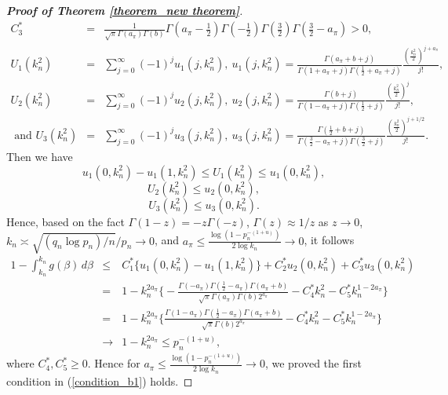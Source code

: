 \documentclass[12pt]{article}
\begin{document}
\begin{proof} [\textbf{Proof of Theorem \ref{theorem_new theorem}}]
\begin{eqnarray*}
		C_3^\ast   &=& \frac{1}{\sqrt{\pi}\Gamma(a_{\pi})\Gamma(b)}    \Gamma(a_{\pi}-\frac{1}{2})\Gamma(-\frac{1}{2})\Gamma(\frac{3}{2})\Gamma(\frac{3}{2}-a_{\pi}) > 0 , \\
		U_1(k_n^2) &=&
		\sum\limits_{j=0}^{\infty}(-1)^j  u_1(j, k_n^2),  \
		u_1(j, k_n^2) =  \frac{\Gamma(a_{\pi}+b+j) }{\Gamma(1+a_{\pi}+j)\Gamma(\frac{1}{2} + a_{\pi}+j) } \frac{ (\frac{k_n^2}{2})^{j+a_{\pi}}} {j!} , \\
		U_2(k_n^2) &=&
		\sum\limits_{j=0}^{\infty} (-1)^j u_2(j, k_n^2),  \
		u_2(j, k_n^2)	 =\frac{\Gamma(b+j) }{\Gamma(1-a_{\pi}+j)\Gamma(\frac{1}{2}+j)} \frac{ (\frac{k_n^2}{2})^j}{j!} , \\
		\text{ and }
		U_3(k_n^2) &=&
		\sum\limits_{j=0}^{\infty} (-1)^ju_3(j, k_n^2),  \
		u_3(j, k_n^2) =  \frac{\Gamma(\frac{1}{2}+b+j)}{\Gamma(\frac{3}{2}-a_{\pi}+j)\Gamma(\frac{3}{2}+j)}
		\frac{(\frac{k_n^2}{2})^{j+1/2}}{j!}.
	\end{eqnarray*}
	Then we have  \[
	u_1(0,k_n^2) -  u_1(1,k_n^2)   \leq U_1(k_n^2)   \leq  u_1(0,k_n^2)  ,
	\]
	\[
	U_2(k_n^2) \leq  u_2(0,k_n^2) ,
	\]
	\[
	U_3(k_n^2)  \leq  u_3(0,k_n^2)  .
	\]
	Hence,   based on the fact  $\Gamma(1-z) = -z\Gamma(-z)$,  $\Gamma(z) \approx 1/z$ as $z\rightarrow0$,   $k_n \asymp \sqrt{(q_n\log p_n)/n}/p_n\rightarrow 0 $,  and $a_{\pi}  \leq  \frac{\log(1-p_n^{-(1+u)})}{2\log k_n}\rightarrow 0$, it follows
	\begin{eqnarray*}
		1 - \int_{k_n}^{k_n} g(\beta)\, d\beta  & \leq  &
		C_1^\ast \Big\{  u_1(0,k_n^2) -  u_1(1,k_n^2)  \Big \} + C_2^\ast u_2(0,k_n^2)   + C_3^\ast u_3(0,k_n^2)  \\
		&=&  1   - k_n^{2a_{\pi}} \Big\{  -\frac{\Gamma(-a_{\pi})\Gamma(\frac{1}{2} - a_{\pi})\Gamma(a_{\pi}+b)}{\sqrt{\pi}\Gamma(a_{\pi})\Gamma(b) 2^{a_{\pi}}}
		- C_4^\ast k_n^2 - C_5^\ast  k_n^{1-2a_{\pi}}  		   \Big\}\\
		&=&  1   - k_n^{2a_{\pi}} \Big\{  \frac{\Gamma(1-a_{\pi})\Gamma(\frac{1}{2} - a_{\pi})\Gamma(a_{\pi}+b)}{\sqrt{\pi} \Gamma(b) 2^{a_{\pi}}}
		- C_4^\ast k_n^2 - C_5^\ast k_n^{1-2a_{\pi}}  		   \Big\}\\
		& \rightarrow &  1   -    k_n^{2a_{\pi}} \leq p_n^{-(1+u)},
	\end{eqnarray*}
	where  $C_4^\ast, C_5^\ast\geq 0$.  Hence for  $a_{\pi}  \leq  \frac{\log(1-p_n^{-(1+u)})}{2\log k_n}\rightarrow 0$, we proved the first condition in   (\ref{condition_b1}) holds.




\end{proof}
\end{document}

